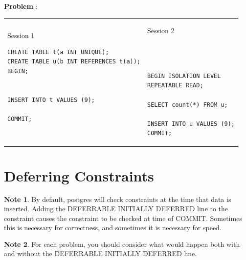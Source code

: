 \documentclass[10pt]{article}
\theoremstyle{definition}
\newtheorem{note}{Note}
\newcounter{ProblemCounter}
\newcommand{\nextproblem}{\filbreak\stepcounter{ProblemCounter} \noindent\textbf{Problem \theProblemCounter}:}
\begin{document}
\nextproblem
\begin{tcolorbox}
\begin{tabular}{p{3.25in}p{3in}}
\hspace{-0.2in}Session 1
\begin{lstlisting}
CREATE TABLE t(a INT UNIQUE);
CREATE TABLE u(b INT REFERENCES t(a));
BEGIN;


INSERT INTO t VALUES (9);

COMMIT;
  
\end{lstlisting}
    &
\hspace{-0.2in}Session 2
\begin{lstlisting}



BEGIN ISOLATION LEVEL
REPEATABLE READ;

SELECT count(*) FROM u;

INSERT INTO u VALUES (9);
COMMIT;
\end{lstlisting}
\end{tabular}
\vspace{-0.2in}
\end{tcolorbox}
\vspace{0.25in}

\section{Deferring Constraints}

\begin{note}
    By default, postgres will check constraints at the time that data is inserted.
    Adding the DEFERRABLE INITIALLY DEFERRED line to the constraint causes the constraint to be checked at time of COMMIT.
    Sometimes this is necessary for correctness, and sometimes it is necessary for speed.
\end{note}

\begin{note}
For each problem, you should consider what would happen both with and without the DEFERRABLE INITIALLY DEFERRED line.
\end{note}

\vspace{0.2in}
\end{document}
